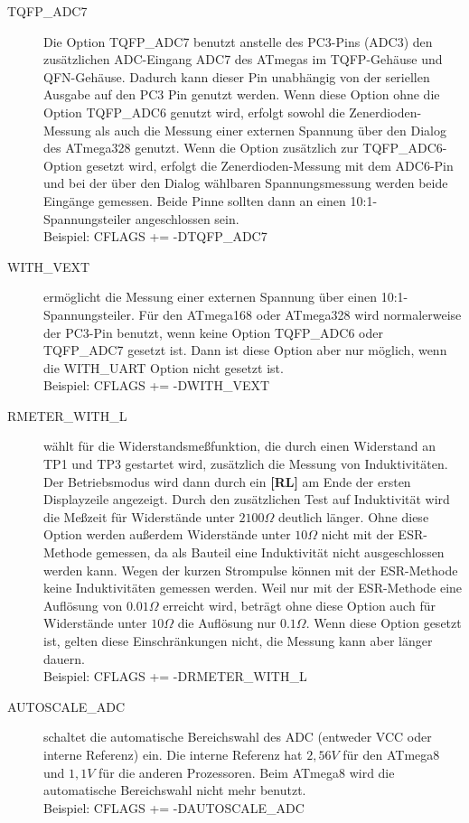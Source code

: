 \begin{description}
  \item[TQFP\_ADC7] Die Option TQFP\_ADC7 benutzt anstelle des PC3-Pins (ADC3) den zusätzlichen ADC-Eingang ADC7
des ATmegas im TQFP-Gehäuse und QFN-Gehäuse.
Dadurch kann dieser Pin unabhängig von der seriellen Ausgabe auf den PC3 Pin genutzt werden. Wenn diese Option 
ohne die Option TQFP\_ADC6 genutzt wird, erfolgt sowohl die Zenerdioden-Messung als auch die Messung einer externen
Spannung über den Dialog des ATmega328 genutzt. Wenn die Option zusätzlich zur TQFP\_ADC6-Option gesetzt wird,
erfolgt die Zenerdioden-Messung mit dem ADC6-Pin und bei der über den Dialog wählbaren Spannungsmessung werden
beide Eingänge gemessen. Beide Pinne sollten dann an einen 10:1-Spannungsteiler angeschlossen sein.\\
Beispiel: CFLAGS += -DTQFP\_ADC7

  \item[WITH\_VEXT] ermöglicht die Messung einer externen Spannung über einen 10:1-Spannungsteiler.
Für den ATmega168 oder ATmega328 wird normalerweise der PC3-Pin benutzt, wenn keine Option TQFP\_ADC6 oder
TQFP\_ADC7 gesetzt ist. Dann ist diese Option aber nur möglich, wenn die WITH\_UART Option nicht gesetzt ist.\\
Beispiel: CFLAGS += -DWITH\_VEXT 

  \item[RMETER\_WITH\_L] wählt für die Widerstandsmeßfunktion, die durch einen Widerstand an TP1 und TP3 gestartet wird,
zusätzlich die Messung von Induktivitäten. Der Betriebsmodus wird dann durch ein {\bf[RL]} am Ende der ersten Displayzeile
angezeigt. Durch den zusätzlichen Test auf Induktivität wird die Meßzeit für Widerstände unter \(2100\Omega\) deutlich
länger. Ohne diese Option werden außerdem Widerstände unter \(10\Omega\) nicht mit der ESR-Methode gemessen,
da als Bauteil eine Induktivität nicht ausgeschlossen werden kann.
Wegen der kurzen Strompulse können mit der ESR-Methode keine Induktivitäten gemessen werden.
Weil nur mit der ESR-Methode eine Auflösung von \(0.01\Omega\) erreicht wird, beträgt ohne diese Option auch für 
Widerstände unter \(10\Omega\) die Auflösung nur \(0.1\Omega\).
Wenn diese Option gesetzt ist, gelten diese Einschränkungen nicht, die Messung kann aber länger dauern.\\
Beispiel: CFLAGS += -DRMETER\_WITH\_L

  \item[AUTOSCALE\_ADC] schaltet die automatische Bereichswahl des ADC (entweder VCC oder interne Referenz) ein.
Die interne Referenz hat \(2,56V\) für den ATmega8 und \(1,1V\) für die anderen Prozessoren.
Beim ATmega8 wird die automatische Bereichswahl nicht mehr benutzt.\\
Beispiel: CFLAGS += -DAUTOSCALE\_ADC


\end{description}
